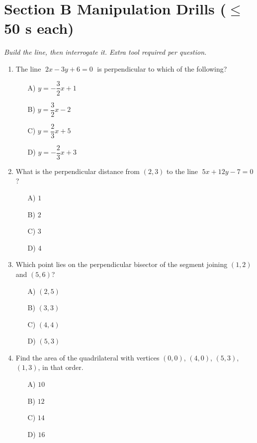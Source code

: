 \documentclass[11pt,a4paper]{article}
\begin{document}
\section*{Section B \quad Manipulation Drills \hfill{\normalfont\small($\leq$50 s each)}}

\noindent\textit{Build the line, then interrogate it. Extra tool required per question.}

\begin{enumerate}

\item The line $\;2x - 3y + 6 = 0\;$ is perpendicular to which of the following?
\begin{itemize}
\item[A)] $y = -\dfrac{3}{2}x + 1$
\item[B)] $y = \dfrac{3}{2}x - 2$
\item[C)] $y = \dfrac{2}{3}x + 5$
\item[D)] $y = -\dfrac{2}{3}x + 3$
\end{itemize}

\item What is the perpendicular distance from $(2,3)$ to the line $\;5x + 12y - 7 = 0$?
\begin{itemize}
\item[A)] $1$
\item[B)] $2$
\item[C)] $3$
\item[D)] $4$
\end{itemize}

\item Which point lies on the perpendicular bisector of the segment joining $(1,2)$ and $(5,6)$?
\begin{itemize}
\item[A)] $(2,5)$
\item[B)] $(3,3)$
\item[C)] $(4,4)$
\item[D)] $(5,3)$
\end{itemize}

\item Find the area of the quadrilateral with vertices $(0,0)$, $(4,0)$, $(5,3)$, $(1,3)$, in that order.
\begin{itemize}
\item[A)] $10$
\item[B)] $12$
\item[C)] $14$
\item[D)] $16$
\end{itemize}


\end{enumerate}
\end{document}
